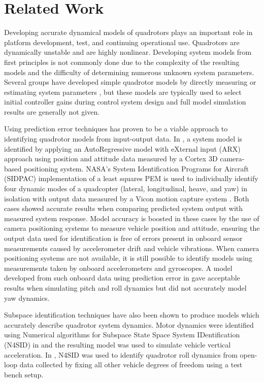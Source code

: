 \section{Related Work}
Developing accurate dynamical models of quadrotors plays an important role in platform development, test, and continuing operational use. Quadrotors are dynamically unstable and are highly nonlinear. Developing system models from first principles is not commonly done due to the complexity of the resulting models and the difficulty of determining numerous unknown system parameters. Several groups have developed simple quadrotor models by directly measuring or estimating system parameters \cite{bresciani2008modelling, domingues2009quadrotor, kivrak2006design, pounds2006modelling, schreier2012modeling}, but these models are typically used to select initial controller gains during control system design and full model simulation results are generally not given. 

Using prediction error techniques has proven to be a viable approach to identifying quadrotor models from input-output data. In \cite{chamberlain2011system}, a system model is identified by applying an AutoRegressive model with eXternal input (ARX) approach using position and attitude data measured by a Cortex 3D camera-based positioning system. NASA's System Identification Programs for Aircraft (SIDPAC) implementation of a least squares PEM is used to individually identify four dynamic modes of a quadcopter (lateral, longitudinal, heave, and yaw) in isolation with output data measured by a Vicon motion capture system \cite{miller2011open}. Both cases showed accurate results when comparing predicted system output with measured system response. Model accuracy is boosted in these cases by the use of camera positioning systems to measure vehicle position and attitude, ensuring the output data used for identification is free of errors present in onboard sensor measurements caused by accelerometer drift and vehicle vibrations. When camera positioning systems are not available, it is still possible to identify models using measurements taken by onboard accelerometers and gyroscopes.  A model developed from such onboard data using prediction error in \cite{lee2011attitude} gave acceptable results when simulating pitch and roll dynamics but did not accurately model yaw dynamics.

Subspace identification techniques have also been shown to produce models which accurately describe quadrotor system dynamics. Motor dynamics were identified using Numerical algorithms for Subspace State Space System IDentification (N4SID) in \cite{kis2011sensor} and the resulting model was used to simulate vehicle vertical acceleration. In \cite{batmazdesign}, N4SID was used to identify quadrotor roll dynamics from open-loop data collected by fixing all other vehicle degrees of freedom using a test bench setup. 


